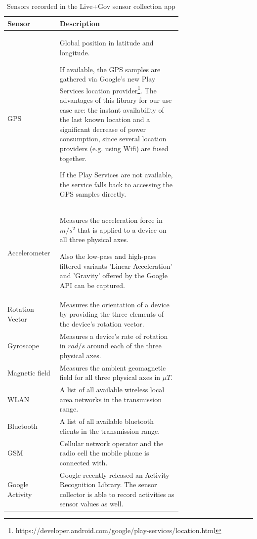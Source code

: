 \begin{table}[ht]
\centering
\begin{tabular}{|l|p{0.7\linewidth}|}
  \hline
  Sensor & Description \\
  \hline
  GPS                 & Global position in latitude and longitude. 

                        If available, the GPS samples are gathered via
                        Google's new Play Services location
                        provider\footnote{https://developer.android.com/google/play-services/location.html}.
                        The advantages of this library for our use case are: the instant
                        availability of the last known location and a significant decrease
                        of power consumption, since several location providers (e.g. using
                        Wifi) are fused together.  
                        
                        If the Play Services are not available, the service falls back to
                        accessing the GPS samples directly.
  \\ \hline
  Accelerometer       & Measures the acceleration force in $m/s^2$
                        that is applied to a device on all three
                        physical axes. 

                        Also the low-pass and high-pass filtered
                        variants 'Linear Acceleration' and 'Gravity' offered by the Google
                        API can be captured.
  \\ 
  Rotation Vector     & Measures the orientation of a device by
                        providing the three elements of the device's
                        rotation vector.  
  \\
  Gyroscope           & Measures a device's rate of rotation in
                        $rad/s$ around each of the three physical
                        axes. 
  \\ 
  Magnetic field      & Measures the ambient geomagnetic field for all
                        three physical axes in $\mu T$. 
  \\ \hline
  WLAN                & A list of all available wireless local area
                        networks in the transmission range. 
  \\
  Bluetooth           & A list of all available bluetooth clients in
                        the transmission range. 
  \\
  GSM                 & Cellular network operator and the radio cell
                        the mobile phone is connected with. 
  \\ \hline
  Google Activity     & Google recently released an Activity
                        Recognition Library. The sensor collector is able to record activities as sensor
                        values as well. 
  \\
  \hline
\end{tabular}
\caption{Sensors recorded in the Live+Gov sensor collection app}
\label{SensorsOfLGCollectionApp}
\end{table}

